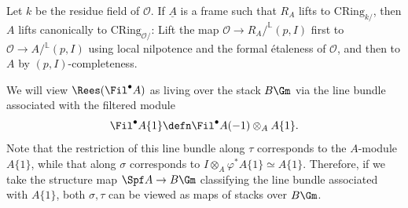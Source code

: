 \documentclass[10pt]{amsart}
\begin{document}
\subsubsection{}
Let $k$ be the residue field of $\mathcal{O}$. If $\underline{A}$ is a frame such that ${R_A}$ lifts to $\mathrm{CRing}_{k/}$, then $A$ lifts canonically to $\mathrm{CRing}_{\mathcal{O}/}$: Lift the map $\mathcal{O}\to {R_A}/^{\mathbb{L}}(p,I)$ first to $\mathcal{O}\to A/{}^{\mathbb{L}}(p,I)$ using local nilpotence and the formal \'etaleness of $\mathcal{O}$, and then to $A$ by $(p,I)$-completeness.  


We will view $\Rees(\Fil^\bullet A)$ as living over the stack $B\Gm$ via the line bundle associated with the filtered module 
\[
\Fil^\bullet A\{1\} \defn \Fil^\bullet A(-1)\otimes_{A}A\{1\}. 
\]
Note that the restriction of this line bundle along $\tau$ corresponds to the $A$-module $A\{1\}$, while that along $\sigma$ corresponds to $I\otimes_A\varphi^*A\{1\}\simeq A\{1\}$. Therefore, if we take the structure map $\Spf A \to B\Gm$ classifying the line bundle associated with $A\{1\}$, both $\sigma,\tau$ can be viewed as maps of stacks over $B\Gm$.
\end{document}
